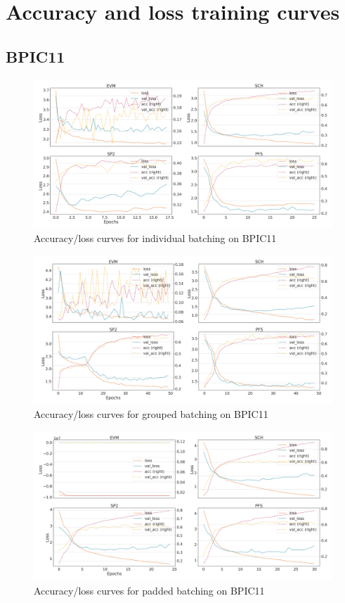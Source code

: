 \chapter{Accuracy and loss training curves}
\label{appendix:loss-curves}

\section*{BPIC11}
\begin{figure}[!htb]
    \centering
    \includegraphics[width=\textwidth]{gfx/bpic2011/individual_loss_acc_curve.png}
    \caption{Accuracy/loss curves for individual batching on BPIC11}
\end{figure}
\begin{figure}[!htb]
    \centering
    \includegraphics[width=\textwidth]{gfx/bpic2011/grouped_loss_acc_curve.png}
    \caption{Accuracy/loss curves for grouped batching on BPIC11}
\end{figure}
\begin{figure}[!htb]
    \centering
    \includegraphics[width=\textwidth]{gfx/bpic2011/padded_loss_acc_curve.png}
    \caption{Accuracy/loss curves for padded batching on BPIC11}
\end{figure}
